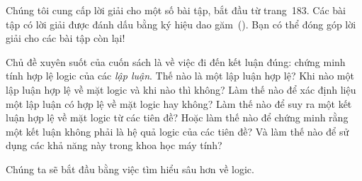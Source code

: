 \begin{infobox}
Chúng tôi cung cấp lời giải cho một số bài tập, bắt đầu từ trang~183. Các bài tập có lời giải được đánh dấu bằng ký hiệu dao găm~(\textdagger). Bạn có thể đóng góp lời giải cho các bài tập còn lại!
\end{infobox}

Chủ đề xuyên suốt của cuốn sách là về việc đi đến kết luận đúng: chứng minh tính hợp lệ logic của các \textit{lập luận}. Thế nào là một lập luận hợp lệ? Khi nào một lập luận hợp lệ về mặt logic và khi nào thì không? Làm thế nào để xác định liệu một lập luận có hợp lệ về mặt logic hay không? Làm thế nào để suy ra một kết luận hợp lệ về mặt logic từ các tiên đề? Hoặc làm thế nào để chứng minh rằng một kết luận không phải là hệ quả logic của các tiên đề? Và làm thế nào để sử dụng các khả năng này trong khoa học máy tính?

Chúng ta sẽ bắt đầu bằng việc tìm hiểu sâu hơn về logic.

